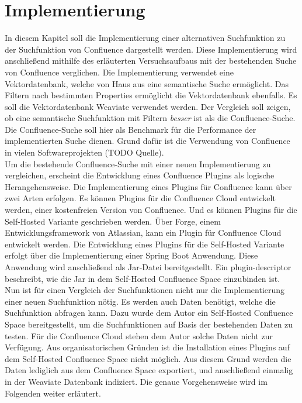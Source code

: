 \chapter{Implementierung}

In diesem Kapitel soll die Implementierung einer alternativen Suchfunktion zu der Suchfunktion von Confluence dargestellt werden.
Diese Implementierung wird anschließend mithilfe des erläuterten Versuchsaufbaus mit der bestehenden Suche von Confluence verglichen.
Die Implementierung verwendet eine Vektordatenbank, welche von Haus aus eine semantische Suche ermöglicht.
Das Filtern nach bestimmten Properties ermöglicht die Vektordatenbank ebenfalls.
Es soll die Vektordatenbank Weaviate verwendet werden.
Der Vergleich soll zeigen, ob eine semantische Suchfunktion mit Filtern \textit{besser} ist als die Confluence-Suche.
Die Confluence-Suche soll hier als Benchmark für die Performance der implementierten Suche dienen.
Grund dafür ist die Verwendung von Confluence in vielen Softwareprojekten (TODO Quelle).\\

Um die bestehende Confluence-Suche mit einer neuen Implementierung zu vergleichen, erscheint die Entwicklung eines Confluence Plugins als logische Herangehensweise.
Die Implementierung eines Plugins für Confluence kann über zwei Arten erfolgen.
Es können Plugins für die Confluence Cloud entwickelt werden, einer kostenfreien Version von Confluence.
Und es können Plugins für die Self-Hosted Variante geschrieben werden.
Über Forge, einem Entwicklungsframework von Atlassian, kann ein Plugin für Confluence Cloud entwickelt werden.
Die Entwicklung eines Plugins für die Self-Hosted Variante erfolgt über die Implementierung einer Spring Boot Anwendung.
Diese Anwendung wird anschließend als Jar-Datei bereitgestellt.
Ein plugin-descriptor beschreibt, wie die Jar in dem Self-Hosted Confluence Space einzubinden ist.\\

Nun ist für einen Vergleich der Suchfunktionen nicht nur die Implementierung einer neuen Suchfunktion nötig.
Es werden auch Daten benötigt, welche die Suchfunktion abfragen kann.
Dazu wurde dem Autor ein Self-Hosted Confluence Space bereitgestellt, um die Suchfunktionen auf Basis der bestehenden Daten zu testen.
Für die Confluence Cloud stehen dem Autor solche Daten nicht zur Verfügung.
Aus organisatorischen Gründen ist die Installation eines Plugins auf dem Self-Hosted Confluence Space nicht möglich.
Aus diesem Grund werden die Daten lediglich aus dem Confluence Space exportiert, und anschließend einmalig in der Weaviate Datenbank indiziert.
Die genaue Vorgehensweise wird im Folgenden weiter erläutert.

